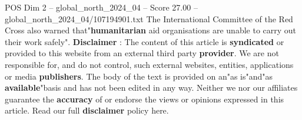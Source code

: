 \begin{textsample}{POS Dim 2 – global\_north\_2024\_04 – Score 27.00 – global\_north\_2024\_04/107194901.txt}
The International Committee of the Red Cross also warned that"\textbf{humanitarian} aid organisations are unable to carry out their work safely". \textbf{Disclaimer} : The content of this article is \textbf{syndicated} or provided to this website from an external third party \textbf{provider}.
We are not responsible for, and do not control, such external websites, entities, applications or media \textbf{publishers}.
The body of the text is provided on an"as is"and"as \textbf{available}"basis and has not been edited in any way.
Neither we nor our affiliates guarantee the \textbf{accuracy} of or endorse the views or opinions expressed in this article.
Read our full \textbf{disclaimer} policy here.

\end{textsample}
